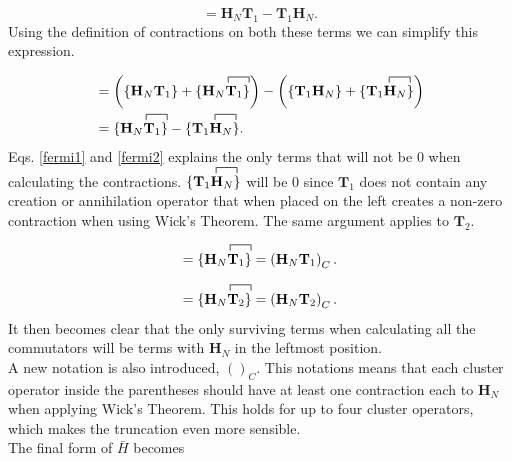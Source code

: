 \documentclass[a4paper,norsk,11pt,twoside]{report}
\begin{document}
\begin{equation}
[\textbf{H}_N, \textbf{T}_1] = \textbf{H}_N \textbf{T}_1 - \textbf{T}_1 \textbf{H}_N .
\end{equation}
Using the definition of contractions on both these terms we can simplify this expression.

\begin{align}
[\textbf{H}_N, \textbf{T}_1] & =
\left( \{\textbf{H}_N\textbf{T}_1\} + \{
\contraction{}{\textbf{H}_N}{}{\textbf{T}_1}
\textbf{H}_N\textbf{T}_1\} \right) - \left(\{\textbf{T}_1\textbf{H}_N\} + \{
\contraction{}{\textbf{T}_1}{}{\textbf{H}_N}
\textbf{T}_1\textbf{H}_N\} \right) \nonumber \\ &
= \{
\contraction{}{\textbf{H}_N}{}{\textbf{T}_1}
\textbf{H}_N\textbf{T}_1\}
- \{
\contraction{}{\textbf{T}_1}{}{\textbf{H}_N}
\textbf{T}_1\textbf{H}_N\} .
\end{align}
Eqs. \eqref{fermi1} and \eqref{fermi2} explains the only terms that will not be 0 when calculating the contractions. $\{ \contraction{}{\textbf{T}_1}{}{\textbf{H}_N}
\textbf{T}_1\textbf{H}_N\}$ will be 0 since $\textbf{T}_1$ does not contain any creation or annihilation operator that when placed on the left creates a non-zero contraction when using Wick's Theorem. The same argument applies to $\textbf{T}_2$. 

\begin{equation}
[\textbf{H}_N, \textbf{T}_1] = 
\{
\contraction{}{\textbf{H}_N}{}{\textbf{T}_1}
\textbf{H}_N\textbf{T}_1\} 
= \left( \textbf{H}_N \textbf{T}_1 \right)_C
.
\end{equation}

\begin{equation}
[\textbf{H}_N, \textbf{T}_2] = 
\{
\contraction{}{\textbf{H}_N}{}{\textbf{T}_2}
\textbf{H}_N\textbf{T}_2\} 
= \left( \textbf{H}_N \textbf{T}_2 \right)_C
.
\end{equation}
It then becomes clear that the only surviving terms when calculating all the commutators will be terms with $\textbf{H}_N$ in the leftmost position. \\

A new notation is also introduced, $()_C$. This notations means that each cluster operator inside the parentheses should have at least one contraction each to $\textbf{H}_N$ when applying Wick's Theorem. This holds for up to four cluster operators, which makes the truncation even more sensible. \\

The final form of $\bar{H}$ becomes
\end{document}

